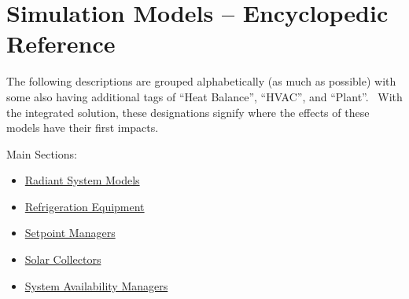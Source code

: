 \chapter{Simulation Models -- Encyclopedic Reference}\label{simulation-models-encyclopedic-reference}

The following descriptions are grouped alphabetically (as much as possible) with some also having additional tags of ``Heat Balance'', ``HVAC'', and ``Plant''.~ With the integrated solution, these designations signify where the effects of these models have their first impacts.

Main Sections:

\begin{itemize}
\tightlist
\item
  \protect\hyperlink{RadiantSystems}{Radiant System Models}
\item
  \protect\hyperlink{Refrigeration}{Refrigeration Equipment}
\item
  \protect\hyperlink{SetpointManagers}{Setpoint Managers}
\item
  \protect\hyperlink{SolarCollectors}{Solar Collectors}
\item
  \protect\hyperlink{AvailManagers}{System Availability Managers} 
\end{itemize}
